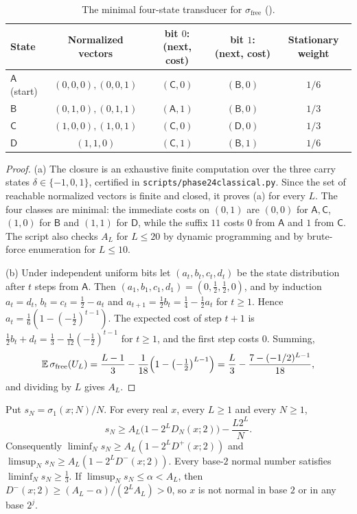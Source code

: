 \documentclass[11pt]{article}
\newcommand{\ttbreak}{\discretionary{}{}{}}
\newcommand{\ttt}[1]{\texttt{\begingroup\def\_{\textunderscore\ttbreak}#1\endgroup}}
\newcommand{\sfree}{\sigma_{\mathrm{free}}}
\newcommand{\Ex}{\mathbb E}
\begin{document}
\begin{table}[ht]
\centering\small
\begin{tabular}{@{}lcccc@{}}
\toprule
State & Normalized vectors & bit $0$: (next, cost) & bit $1$: (next, cost) & Stationary weight \\
\midrule
$\mathsf A$ (start) & $(0,0,0),(0,0,1)$ & $(\mathsf C,0)$ & $(\mathsf B,0)$ & $1/6$ \\
$\mathsf B$ & $(0,1,0),(0,1,1)$ & $(\mathsf A,1)$ & $(\mathsf B,0)$ & $1/3$ \\
$\mathsf C$ & $(1,0,0),(1,0,1)$ & $(\mathsf C,0)$ & $(\mathsf D,0)$ & $1/3$ \\
$\mathsf D$ & $(1,1,0)$ & $(\mathsf C,1)$ & $(\mathsf B,1)$ & $1/6$ \\
\bottomrule
\end{tabular}
\caption{The minimal four-state transducer for $\sfree$ ().}\label{tab:transducer}
\end{table}

\begin{proof}
(a) The closure is an exhaustive finite computation over the three carry states $\delta\in\{-1,0,1\}$, certified in \ttt{scripts/phase24\_classical.py}. Since the set of reachable normalized vectors is finite and closed, it proves (a) for every $L$. The four classes are minimal: the immediate costs on $(0,1)$ are $(0,0)$ for $\mathsf A,\mathsf C$, $(1,0)$ for $\mathsf B$ and $(1,1)$ for $\mathsf D$, while the suffix $11$ costs $0$ from $\mathsf A$ and $1$ from $\mathsf C$. The script also checks $A_L$ for $L\le20$ by dynamic programming and by brute-force enumeration for $L\le10$.

(b) Under independent uniform bits let $(a_t,b_t,c_t,d_t)$ be the state distribution after $t$ steps from $\mathsf A$. Then $(a_1,b_1,c_1,d_1)=(0,\frac12,\frac12,0)$, and by induction $a_t=d_t$, $b_t=c_t=\frac12-a_t$ and $a_{t+1}=\frac12b_t=\frac14-\frac12a_t$ for $t\ge1$. Hence $a_t=\frac16(1-(-\frac12)^{t-1})$. The expected cost of step $t+1$ is $\frac12b_t+d_t=\frac13-\frac1{12}(-\frac12)^{t-1}$ for $t\ge1$, and the first step costs $0$. Summing,
\[
\Ex\,\sfree(U_L)=\frac{L-1}3-\frac1{18}\Bigl(1-\bigl(-\tfrac12\bigr)^{L-1}\Bigr)=\frac L3-\frac{7-(-1/2)^{L-1}}{18},
\]
and dividing by $L$ gives $A_L$.
\end{proof}

\begin{theorem}\label{thm:floor}
Put $s_N=\sigma_1(x;N)/N$. For every real $x$, every $L\ge1$ and every $N\ge1$,
\begin{equation}\label{eq:finite-floor}
s_N\ge A_L\bigl(1-2^LD_N(x;2)\bigr)-\frac{L2^L}N.
\end{equation}
Consequently $\liminf_Ns_N\ge A_L(1-2^LD^+(x;2))$ and $\limsup_Ns_N\ge A_L(1-2^LD^-(x;2))$. Every base-$2$ normal number satisfies $\liminf_Ns_N\ge\frac13$. If $\limsup_Ns_N\le\alpha<A_L$, then $D^-(x;2)\ge(A_L-\alpha)/(2^LA_L)>0$, so $x$ is not normal in base $2$ or in any base $2^j$.
\end{theorem}
\end{document}
